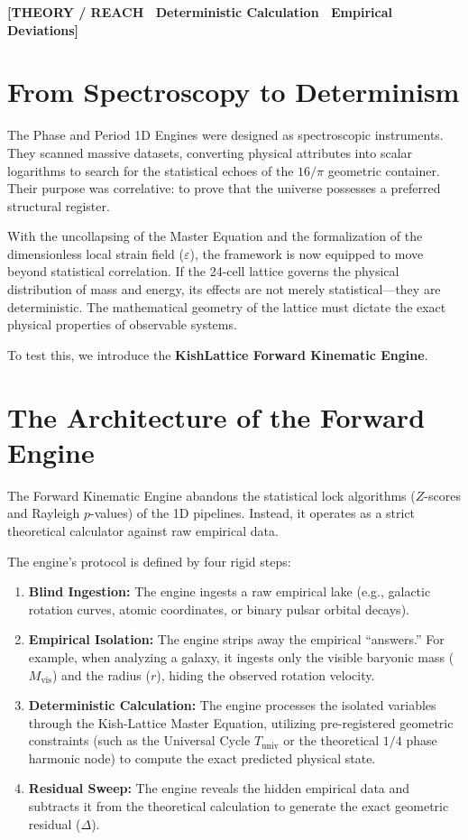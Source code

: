 \documentclass[11pt, letterpaper, openany]{book}
\begin{document}
\begin{center}
{\color{theorytag}\textbf{[THEORY / REACH \textbullet\ Deterministic Calculation \textbullet\ Empirical Deviations]}}
\end{center}

\section{From Spectroscopy to Determinism}

The Phase and Period 1D Engines were designed as spectroscopic instruments. They scanned massive datasets, converting physical attributes into scalar logarithms to search for the statistical echoes of the $16/\pi$ geometric container. Their purpose was correlative: to prove that the universe possesses a preferred structural register.

With the uncollapsing of the Master Equation and the formalization of the dimensionless local strain field ($\varepsilon$), the framework is now equipped to move beyond statistical correlation. If the 24-cell lattice governs the physical distribution of mass and energy, its effects are not merely statistical—they are deterministic. The mathematical geometry of the lattice must dictate the exact physical properties of observable systems.

To test this, we introduce the \textbf{KishLattice Forward Kinematic Engine}.

\section{The Architecture of the Forward Engine}

The Forward Kinematic Engine abandons the statistical lock algorithms ($Z$-scores and Rayleigh $p$-values) of the 1D pipelines. Instead, it operates as a strict theoretical calculator against raw empirical data.

The engine's protocol is defined by four rigid steps:

\begin{enumerate}
    \item \textbf{Blind Ingestion:} The engine ingests a raw empirical lake (e.g., galactic rotation curves, atomic coordinates, or binary pulsar orbital decays).
    \item \textbf{Empirical Isolation:} The engine strips away the empirical ``answers.'' For example, when analyzing a galaxy, it ingests only the visible baryonic mass ($M_{\text{vis}}$) and the radius ($r$), hiding the observed rotation velocity.
    \item \textbf{Deterministic Calculation:} The engine processes the isolated variables through the Kish-Lattice Master Equation, utilizing pre-registered geometric constraints (such as the Universal Cycle $T_{\text{univ}}$ or the theoretical $1/4$ phase harmonic node) to compute the exact predicted physical state.
    \item \textbf{Residual Sweep:} The engine reveals the hidden empirical data and subtracts it from the theoretical calculation to generate the exact geometric residual ($\Delta$).
\end{enumerate}
\end{document}
